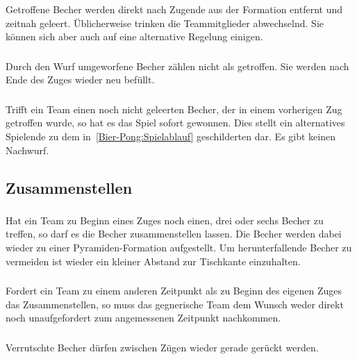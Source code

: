 \subsubsection{}
Getroffene Becher werden direkt nach Zugende aus der Formation entfernt und zeitnah geleert.
Üblicherweise trinken die Teammitglieder abwechselnd.
Sie können sich aber auch auf eine alternative Regelung einigen.

\subsubsection{}
Durch den Wurf umgeworfene Becher zählen nicht als getroffen.
Sie werden nach Ende des Zuges wieder neu befüllt.

\subsubsection{}
Trifft ein Team einen noch nicht geleerten Becher, der in einem vorherigen Zug getroffen wurde, so hat es das Spiel sofort gewonnen.
Dies stellt ein alternatives Spielende zu dem in~\ref{Bier-Pong:Spielablauf} geschilderten dar.
Es gibt keinen Nachwurf.

\subsection{Zusammenstellen}
\subsubsection{}
Hat ein Team zu Beginn eines Zuges noch einen, drei oder sechs Becher zu treffen, so darf es die Becher zusammenstellen lassen.
Die Becher werden dabei wieder zu einer Pyramiden-Formation aufgestellt.
Um herunterfallende Becher zu vermeiden ist wieder ein kleiner Abstand zur Tischkante einzuhalten.

\subsubsection{}
Fordert ein Team zu einem anderen Zeitpunkt als zu Beginn des eigenen Zuges das Zusammenstellen, so muss das gegnerische Team dem Wunsch weder direkt noch unaufgefordert zum angemessenen Zeitpunkt nachkommen.

\subsubsection{}
Verrutschte Becher dürfen zwischen Zügen wieder gerade gerückt werden.

